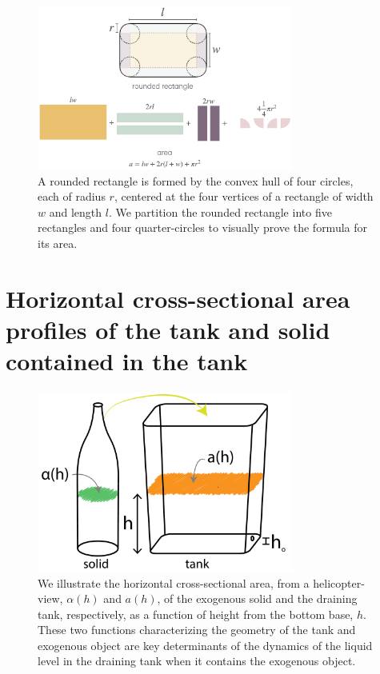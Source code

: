 \documentclass[a4paper,fleqn]{cas-sc}
\begin{document}
\begin{figure}[h!]
	\centering
	\includegraphics[width=0.75\textwidth]{../drawings_and_photos/rounded_rectangle.png} 
	\caption{A rounded rectangle \cite{rounded_rect} is formed by the convex hull of four circles, each of radius $r$, centered at the four vertices of a rectangle of width $w$ and length $l$. We partition the rounded rectangle into five rectangles and four quarter-circles to visually prove the formula for its area.} \label{fig:rounded_rectangle}
\end{figure}

\clearpage

\section{Horizontal cross-sectional area profiles of the tank and solid contained in the tank}

\begin{figure}[h!]
	\centering
	\includegraphics[width=0.75\textwidth]{../drawings_and_photos/a_of_h.pdf} 
	\caption{We illustrate the horizontal cross-sectional area, from a helicopter-view, $\alpha(h)$ and $a(h)$, of the exogenous solid and the draining tank, respectively, as a function of height from the bottom base, $h$. These two functions characterizing the geometry of the tank and exogenous object are key determinants of the dynamics of the liquid level in the draining tank when it contains the exogenous object.} \label{fig:a_and_alpha_of_h_illustration}
\end{figure}
\end{document}
